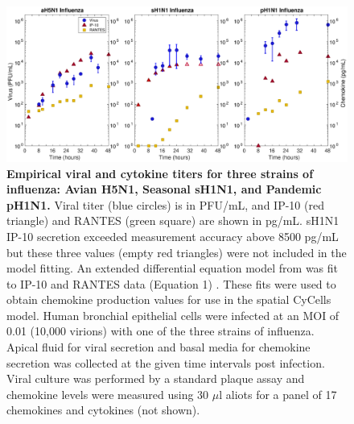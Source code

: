 \documentclass[preprint,10pt,authoryear]{elsarticle}
\begin{document}
\begin{figure}[!ht]
\begin{center}
 \includegraphics[width=\textwidth]{Figure_3}
 \end{center}
\caption{{\bf Empirical viral and cytokine titers for three strains of influenza: Avian H5N1, Seasonal sH1N1, and Pandemic pH1N1.}  Viral titer (blue circles) is in PFU/mL, and IP-10 (red triangle) and RANTES (green square) are shown in pg/mL.   sH1N1 IP-10 secretion exceeded measurement accuracy above 8500 pg/mL but these three values (empty red triangles) were not included in the model fitting.  An extended differential equation model from \citep{Mitchell2011} was fit to IP-10 and RANTES data (Equation 1) .  These fits were used to obtain chemokine production values for use in the spatial CyCells model.  Human bronchial epithelial cells were infected at an MOI of 0.01 (10,000 virions) with one of the three strains of influenza.  Apical fluid for viral secretion and basal media for chemokine secretion was collected at the given time intervals post infection.  Viral culture was performed by a standard plaque assay and chemokine levels were measured using 30 $\mu$l aliots for a panel of 17 chemokines and cytokines (not shown).} 
 \label{fig:data}
\end{figure}
\end{document}
